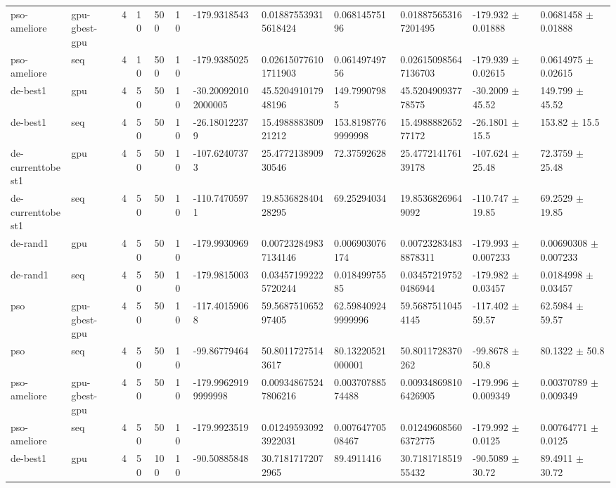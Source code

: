 \begin{table}[t]
\begin{tabular}{llllllllllll}
pso-ameliore & gpu-gbest-gpu & 4 & 10 & 500 & 10 & -179.9318543 & 0.018875539315618424 & 0.06814575196 & 0.018875653167201495 & -179.932 $\pm$ 0.01888 & 0.0681458 $\pm$ 0.01888 \\
pso-ameliore & seq & 4 & 10 & 500 & 10 & -179.9385025 & 0.026150776101711903 & 0.06149749756 & 0.026150985647136703 & -179.939 $\pm$ 0.02615 & 0.0614975 $\pm$ 0.02615 \\
de-best1 & gpu & 4 & 50 & 50 & 10 & -30.200920102000005 & 45.520491017948196 & 149.79907985 & 45.520490937778575 & -30.2009 $\pm$ 45.52 & 149.799 $\pm$ 45.52 \\
de-best1 & seq & 4 & 50 & 50 & 10 & -26.180122379 & 15.498888380921212 & 153.81987769999998 & 15.498888265277172 & -26.1801 $\pm$ 15.5 & 153.82 $\pm$ 15.5 \\
de-currenttobest1 & gpu & 4 & 50 & 50 & 10 & -107.62407373 & 25.477213890930546 & 72.37592628 & 25.477214176139178 & -107.624 $\pm$ 25.48 & 72.3759 $\pm$ 25.48 \\
de-currenttobest1 & seq & 4 & 50 & 50 & 10 & -110.74705971 & 19.853682840428295 & 69.25294034 & 19.85368269649092 & -110.747 $\pm$ 19.85 & 69.2529 $\pm$ 19.85 \\
de-rand1 & gpu & 4 & 50 & 50 & 10 & -179.9930969 & 0.007232849837134146 & 0.006903076174 & 0.007232834838878311 & -179.993 $\pm$ 0.007233 & 0.00690308 $\pm$ 0.007233 \\
de-rand1 & seq & 4 & 50 & 50 & 10 & -179.9815003 & 0.034571992225720244 & 0.01849975585 & 0.034572197520486944 & -179.982 $\pm$ 0.03457 & 0.0184998 $\pm$ 0.03457 \\
pso & gpu-gbest-gpu & 4 & 50 & 50 & 10 & -117.40159068 & 59.568751065297405 & 62.598409249999996 & 59.56875110454145 & -117.402 $\pm$ 59.57 & 62.5984 $\pm$ 59.57 \\
pso & seq & 4 & 50 & 50 & 10 & -99.86779464 & 50.80117275143617 & 80.13220521000001 & 50.8011728370262 & -99.8678 $\pm$ 50.8 & 80.1322 $\pm$ 50.8 \\
pso-ameliore & gpu-gbest-gpu & 4 & 50 & 50 & 10 & -179.99629199999998 & 0.009348675247806216 & 0.00370788574488 & 0.009348698106426905 & -179.996 $\pm$ 0.009349 & 0.00370789 $\pm$ 0.009349 \\
pso-ameliore & seq & 4 & 50 & 50 & 10 & -179.9923519 & 0.012495930923922031 & 0.00764770508467 & 0.012496085606372775 & -179.992 $\pm$ 0.0125 & 0.00764771 $\pm$ 0.0125 \\
de-best1 & gpu & 4 & 50 & 100 & 10 & -90.50885848 & 30.71817172072965 & 89.4911416 & 30.718171851955432 & -90.5089 $\pm$ 30.72 & 89.4911 $\pm$ 30.72 \\

\end{tabular}
\end{table}
